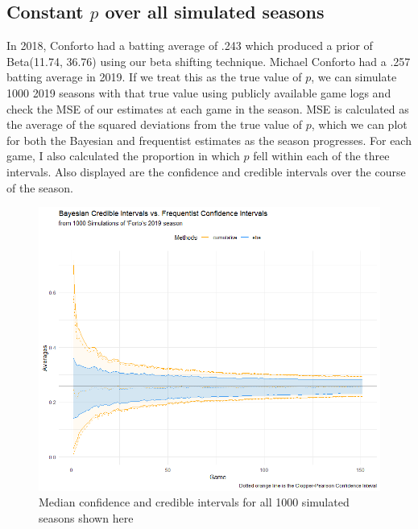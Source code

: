 \documentclass[10pt,a4paper]{article}
\begin{document}
\subsection{Constant $p$ over all simulated seasons}
In 2018, Conforto had a batting average of .243 which produced a prior of Beta(11.74, 36.76) using our beta shifting technique.
Michael Conforto had a .257 batting average in 2019. If we treat this as the true value of $p$, we can simulate 1000 2019 seasons with that true value using publicly available game logs and check the MSE of our estimates at each game in the season.
MSE is calculated as the average of the squared deviations from the true value of $p$, which we can plot for both the Bayesian and frequentist estimates as the season progresses.
For each game, I also calculated the proportion in which $p$ fell within each of the three intervals.
Also displayed are the confidence and credible intervals over the course of the season.

\begin{figure}[ht]
	\centering
	\includegraphics[width=.7\linewidth]{intervals_2019}
	\caption{\label{fig:intervals_2019} Median confidence and credible intervals for all 1000 simulated seasons shown here}
\end{figure}
\end{document}

